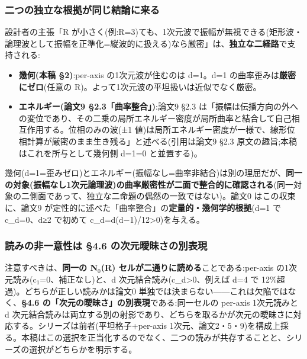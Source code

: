 \documentclass[
]{ltjsarticle}
\providecommand{\tightlist}{%
  \setlength{\itemsep}{0pt}\setlength{\parskip}{0pt}}
\begin{document}
\subsubsection{二つの独立な根拠が同じ結論に来る}\label{ux4e8cux3064ux306eux72ecux7acbux306aux6839ux62e0ux304cux540cux3058ux7d50ux8ad6ux306bux6765ux308b}

設計者の主張「R
が小さく(例:R=3)ても、1次元波で振幅が無視できる(矩形波・論理波として振幅を正準化=縦波的に扱える)なら厳密」は、\textbf{独立な二経路}で支持される:

\begin{itemize}
\tightlist
\item
  \textbf{幾何(本稿 §2)}:per-axis の1次元波が住むのは d=1。d=1
  の曲率歪みは\textbf{厳密にゼロ}(任意の
  R)。よって1次元波の平坦扱いは近似でなく厳密。
\item
  \textbf{エネルギー(論文9 §2.3「曲率整合」)}:論文9 §2.3
  は「振幅は伝播方向の外への変位であり、その二乗の局所エネルギー密度が局所曲率と結合して自己相互作用する。位相のみの波(±1
  値)は局所エネルギー密度が一様で、線形位相計算が厳密のまま生き残る」と述べる(引用は論文9
  §2.3 原文の趣旨;本稿はこれを所与として幾何側 d=1=0 と並置する)。
\end{itemize}

幾何(d=1=歪みゼロ)とエネルギー(振幅なし=曲率非結合)は別の理屈だが、\textbf{同一の対象(振幅なし1次元論理波)の曲率厳密性が二面で整合的に確認される}(同一対象の二側面であって、独立な二命題の偶然の一致ではない)。論文0
はこの収束に、論文9
が定性的に述べた「曲率整合」の\textbf{定量的・幾何学的根拠}(d=1 で
c\_d=0、d≥2 で初めて c\_d=d(d−1)/12\textgreater0)を与える。

\subsubsection{読みの非一意性は §4.6
の次元曖昧さの別表現}\label{ux8aadux307fux306eux975eux4e00ux610fux6027ux306f-4.6-ux306eux6b21ux5143ux66d6ux6627ux3055ux306eux5225ux8868ux73fe}

注意すべきは、\textbf{同一の N\(_{0}\)(R)
セルが二通りに読める}ことである:per-axis
の1次元読み(c\(_{1}\)=0、補正なし)と、d
次元結合読み(c\_d\textgreater0、例えば d=4 で
12\%超過)。どちらが正しい読みかは論文0
単独では決まらない------これは欠陥ではなく、\textbf{§4.6
の「次元の曖昧さ」の別表現}である:同一セルの per-axis 1次元読みと d
次元結合読みは両立する別の射影であり、どちらを取るかが次元の曖昧さに対応する。シリーズは前者(平坦格子+per-axis
1次元、論文2・5・9)を構成上採る。本稿はこの選択を正当化するのでなく、二つの読みが共存することと、シリーズの選択がどちらかを明示する。
\end{document}
